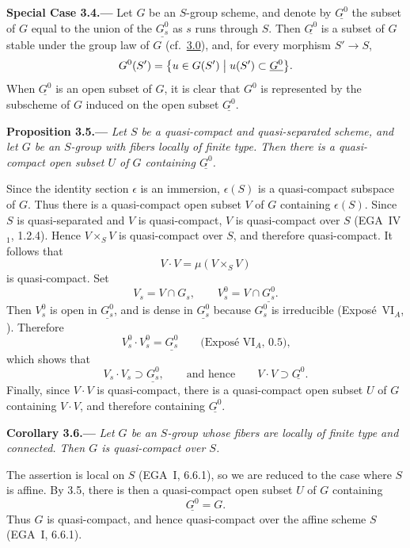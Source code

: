 \medskip
{}\label{case:sga3-VIB-3.4}%
\noindent\textbf{Special Case 3.4.---}
Let \(G\) be an \(S\)-group scheme, and denote by
\(\underline{G^0}\) the subset of \(G\) equal to the union of the
\(\underline{G_s^0}\) as \(s\) runs through \(S\). Then
\(\underline{G^0}\) is a subset of \(G\) stable under the group law
of \(G\) (cf.\ \hyperref[par:sga3-VIB-3.0]{3.0}), and, for every morphism \(S'\to S\),
\[
  G^0(S')
    =
  \bigl\{u\in G(S')\bigm|
    u(S')\subset\underline{G^0}\bigr\}.
\]
When \(\underline{G^0}\) is an open subset of \(G\), it is clear
that \(G^0\) is represented by the subscheme of \(G\) induced on
the open subset \(\underline{G^0}\).

\medskip
{}\label{prop:sga3-VIB-3.5}%
\noindent\textbf{Proposition 3.5.---}
\emph{Let \(S\) be a quasi-compact and quasi-separated scheme, and
let \(G\) be an \(S\)-group with fibers locally of finite type.
Then there is a quasi-compact open subset \(U\) of \(G\) containing
\(\underline{G^0}\).}

Since the identity section \(\epsilon\) is an immersion,
\(\epsilon(S)\) is a quasi-compact subspace of \(G\). Thus there is
a quasi-compact open subset \(V\) of \(G\) containing
\(\epsilon(S)\). Since \(S\) is quasi-separated and \(V\) is
quasi-compact, \(V\) is quasi-compact over \(S\)
(EGA~IV\(_1\), 1.2.4). Hence \(V\times_SV\) is quasi-compact over
\(S\), and therefore quasi-compact. It follows that
\[
  V\cdot V=\mu(V\times_SV)
\]
is quasi-compact. Set
\[
  V_s=V\cap G_s,
  \qquad
  V_s^0=V\cap\underline{G_s^0}.
\]
Then \(V_s^0\) is open in \(\underline{G_s^0}\), and is dense in
\(\underline{G_s^0}\) because \(G_s^0\) is irreducible
(Expos\'e~VI\(_A\), ). Therefore
\[
  V_s^0\cdot V_s^0=\underline{G_s^0}
  \qquad
  \text{(Expos\'e~VI\(_A\), 0.5),}
\]
which shows that
\[
  V_s\cdot V_s\supset\underline{G_s^0},
  \qquad\text{and hence}\qquad
  V\cdot V\supset\underline{G^0}.
\]
Finally, since \(V\cdot V\) is quasi-compact, there is a
quasi-compact open subset \(U\) of \(G\) containing \(V\cdot V\),
and therefore containing \(\underline{G^0}\).

\medskip
{}\label{cor:sga3-VIB-3.6}%
\noindent\textbf{Corollary 3.6.---}
\emph{Let \(G\) be an \(S\)-group whose fibers are locally of
finite type and connected. Then \(G\) is quasi-compact over \(S\).}

The assertion is local on \(S\) (EGA~I, 6.6.1), so we are reduced
to the case where \(S\) is affine. By 3.5, there is then a
quasi-compact open subset \(U\) of \(G\) containing
\[
  \underline{G^0}=G.
\]
Thus \(G\) is quasi-compact, and hence quasi-compact over the affine
scheme \(S\) (EGA~I, 6.6.1).
